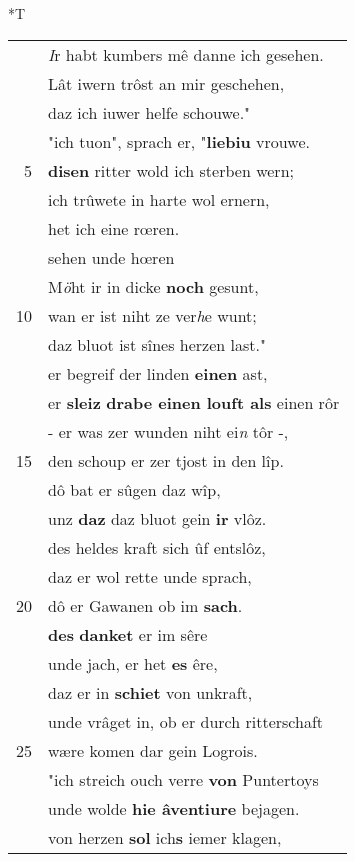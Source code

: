 \documentclass[8pt,a4paper,notitlepage]{article}
\begin{document}
\begin{table}[ht]
\begin{minipage}[t]{0.5\linewidth}
\small
\begin{center}*T
\end{center}
\begin{tabular}{rl}
 & \textit{I}r habt kumbers mê danne ich gesehen.\\ 
 & Lât iwern trôst an mir geschehen,\\ 
 & daz ich iuwer helfe schouwe."\\ 
 & "ich tuon", sprach er, "\textbf{liebiu} vrouwe.\\ 
5 & \textbf{disen} ritter wold ich sterben wern;\\ 
 & ich trûwete in harte wol ernern,\\ 
 & het ich eine rœren.\\ 
 & sehen unde hœren\\ 
 & M\textit{ö}ht ir in dicke \textbf{noch} gesunt,\\ 
10 & wan er ist niht ze ver\textit{h}e wunt;\\ 
 & daz bluot ist sînes herzen last."\\ 
 & er begreif der linden \textbf{einen} ast,\\ 
 & er \textbf{sleiz} \textbf{drabe einen louft als} einen rôr\\ 
 & - er was zer wunden niht ei\textit{n} tôr -,\\ 
15 & den schoup er zer tjost in den lîp.\\ 
 & dô bat er sûgen daz wîp,\\ 
 & unz \textbf{daz} daz bluot gein \textbf{ir} vlôz.\\ 
 & des heldes kraft sich ûf entslôz,\\ 
 & daz er wol rette unde sprach,\\ 
20 & dô er Gawanen ob im \textbf{sach}.\\ 
 & \textbf{des} \textbf{danket} er im sêre\\ 
 & unde jach, er het \textbf{es} êre,\\ 
 & daz er in \textbf{schiet} von unkraft,\\ 
 & unde vrâget in, ob er durch ritterschaft\\ 
25 & wære komen dar gein Logrois.\\ 
 & "ich streich ouch verre \textbf{von} Puntertoys\\ 
 & unde wolde \textbf{hie âventiure} bejagen.\\ 
 & von herzen \textbf{sol} ich\textbf{s} iemer klagen,\\ 

\end{tabular}
\end{minipage}
\end{table}
\end{document}
